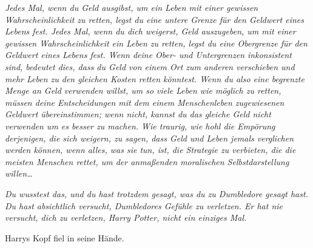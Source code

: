 \emph{Jedes Mal, wenn du Geld ausgibst, um ein Leben mit einer gewissen Wahrscheinlichkeit zu retten, legst du eine untere Grenze für den Geldwert eines Lebens fest. Jedes Mal, wenn du dich weigerst, Geld auszugeben, um mit einer gewissen Wahrscheinlichkeit ein Leben zu retten, legst du eine Obergrenze für den Geldwert eines Lebens fest. Wenn deine Ober- und Untergrenzen inkonsistent sind, bedeutet dies, dass du Geld von einem Ort zum anderen verschieben und mehr Leben zu den gleichen Kosten retten könntest. Wenn du also eine begrenzte Menge an Geld verwenden willst, um so viele Leben wie möglich zu retten, müssen deine Entscheidungen mit dem einem Menschenleben zugewiesenen Geldwert übereinstimmen; wenn nicht, kannst du das gleiche Geld nicht verwenden um es besser zu machen.
Wie traurig, wie hohl die Empörung derjenigen, die sich weigern, zu sagen, dass Geld und Leben jemals verglichen werden können, wenn alles, was sie tun, ist, die Strategie zu verbieten, die die meisten Menschen rettet, um der anmaßenden moralischen Selbstdarstellung willen…}



\emph{Du \emph{wusstest} das, und du hast trotzdem gesagt, was du zu Dumbledore gesagt hast. Du hast absichtlich versucht, Dumbledores Gefühle zu verletzen. Er hat nie versucht, dich zu verletzen, Harry Potter, nicht ein einziges Mal.}

Harrys Kopf fiel in seine Hände.

